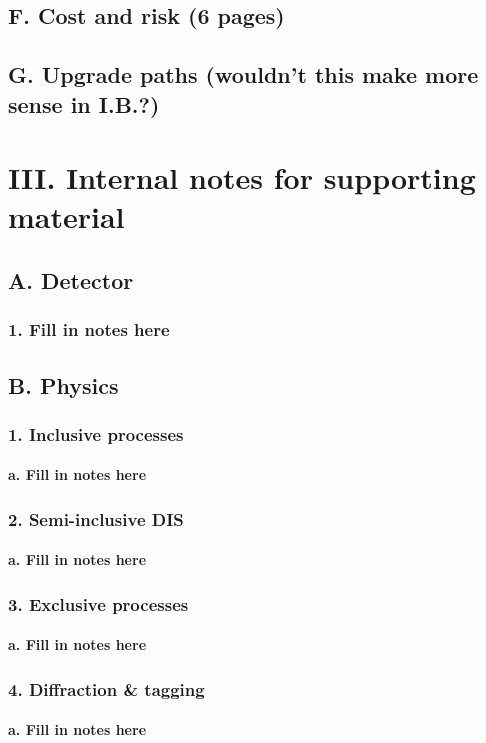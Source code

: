 \documentclass{report}
\begin{document}
\section{F. Cost and risk (6 pages)}
\section{G. Upgrade paths (wouldn’t this make more sense in I.B.?)}
%
\chapter{III. Internal notes for supporting material}
%
\section{A. Detector}
\subsection{1. Fill in notes here}
%
\section{B. Physics}
\subsection{1. Inclusive processes}
\subsubsection{a. Fill in notes here}
\subsection{2. Semi-inclusive DIS}
\subsubsection{a. Fill in notes here}
\subsection{3. Exclusive processes} 
\subsubsection{a. Fill in notes here}
\subsection{4. Diffraction & tagging}
\subsubsection{a. Fill in notes here}
\end{document}
